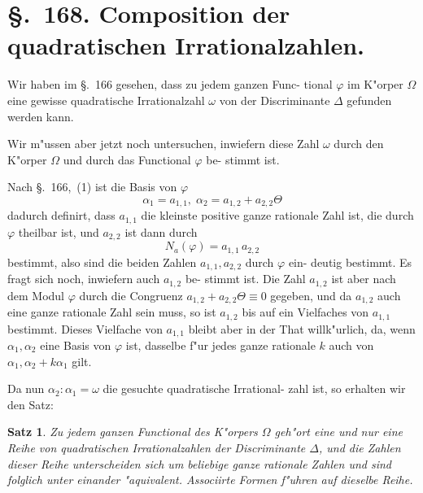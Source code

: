 \documentclass[12pt,a4paper]{article}
\theoremstyle{weber}
\newtheorem*{satz}{Satz}
\begin{document}
\newpage
\section*{\S.~168. Composition der quadratischen Irrationalzahlen.}

Wir haben im \S.~166 gesehen, dass zu jedem ganzen Func-
tional $\varphi$ im K"orper $\varOmega$ eine gewisse quadratische Irrationalzahl $\omega$
von der Discriminante $\varDelta$ gefunden werden kann.

Wir m"ussen aber jetzt noch untersuchen, inwiefern diese
Zahl $\omega$ durch den K"orper $\varOmega$ und durch das Functional $\varphi$ be-
stimmt ist.

Nach \S.~166,~(1) ist die Basis von $\varphi$
\begin{equation}\label{eq:s168-1}
\alpha_1 = a_{1,1}, \; \alpha_2 = a_{1,2} + a_{2,2}\varTheta
\end{equation}
dadurch definirt, dass $a_{1,1}$ die kleinste positive ganze rationale
Zahl ist, die durch $\varphi$ theilbar ist, und $a_{2,2}$ ist dann durch
\begin{equation}\label{eq:s168-2}
N_a(\varphi) = a_{1,1}\,a_{2,2}
\end{equation}
bestimmt, also sind die beiden Zahlen $a_{1,1}, a_{2,2}$ durch $\varphi$ ein-
deutig bestimmt. Es fragt sich noch, inwiefern auch $a_{1,2}$ be-
stimmt ist. Die Zahl $a_{1,2}$ ist aber nach dem Modul $\varphi$ durch die
Congruenz $a_{1,2} + a_{2,2}\varTheta \equiv 0$ gegeben, und da $a_{1,2}$ auch eine
ganze rationale Zahl sein muss, so ist $a_{1,2}$ bis auf ein Vielfaches
von $a_{1,1}$ bestimmt. Dieses Vielfache von $a_{1,1}$ bleibt aber in der
That willk"urlich, da, wenn $\alpha_1, \alpha_2$ eine Basis von $\varphi$ ist, dasselbe
f"ur jedes ganze rationale $k$ auch von $\alpha_1, \alpha_2 + k\alpha_1$ gilt.

Da nun $\alpha_2 : \alpha_1 = \omega$ die gesuchte quadratische Irrational-
zahl ist, so erhalten wir den Satz:

\begin{satz}
Zu jedem ganzen Functional des K"orpers $\varOmega$ geh"ort
eine und nur eine Reihe von quadratischen
Irrationalzahlen der Discriminante $\varDelta$, und die
Zahlen dieser Reihe unterscheiden sich um
beliebige ganze rationale Zahlen und sind
folglich unter einander "aquivalent. Associirte
Formen f"uhren auf dieselbe Reihe.
\end{satz}
\end{document}
